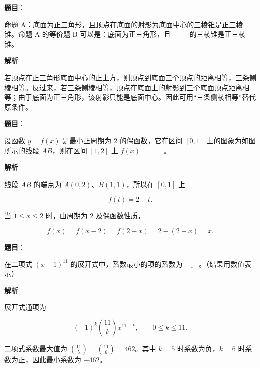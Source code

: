 \begin{answer}

\textbf{题目}：

命题 A：底面为正三角形，且顶点在底面的射影为底面中心的三棱锥是正三棱锥。命题 A 的等价题 B 可以是：底面为正三角形，且 $\underline{\qquad}$ 的三棱锥是正三棱锥。

\textbf{解析}

若顶点在正三角形底面中心的正上方，则顶点到底面三个顶点的距离相等，三条侧棱相等。反过来，若三条侧棱相等，顶点在底面上的射影到三个底面顶点距离相等；由于底面为正三角形，该射影只能是底面中心。因此可用“三条侧棱相等”替代原条件。


\end{answer}
\begin{answer}

\textbf{题目}：

设函数 $y=f(x)$ 是最小正周期为 2 的偶函数，它在区间 $[0,1]$ 上的图象为如图所示的线段 $AB$，则在区间 $[1,2]$ 上 $f(x)=\underline{\qquad}$。
\nopagebreak[4]
\begin{center}\end{center}
\nopagebreak[4]
\textbf{解析}

线段 $AB$ 的端点为 $A(0,2)$、$B(1,1)$，所以在 $[0,1]$ 上

\nopagebreak[4]
\[
f(t)=2-t.
\]

当 $1\le x\le2$ 时，由周期为 $2$ 及偶函数性质，

\nopagebreak[4]
\[
f(x)=f(x-2)=f(2-x)=2-(2-x)=x.
\]


\end{answer}
\begin{answer}

\textbf{题目}：

在二项式 $(x-1)^{11}$ 的展开式中，系数最小的项的系数为 $\underline{\qquad}$。（结果用数值表示）

\textbf{解析}

展开式通项为

\nopagebreak[4]
\[
(-1)^k\binom{11}{k}x^{11-k},\qquad 0\le k\le11.
\]

二项式系数最大值为 $\binom{11}{5}=\binom{11}{6}=462$。其中 $k=5$ 时系数为负，$k=6$ 时系数为正，因此最小系数为 $-462$。


\end{answer}
